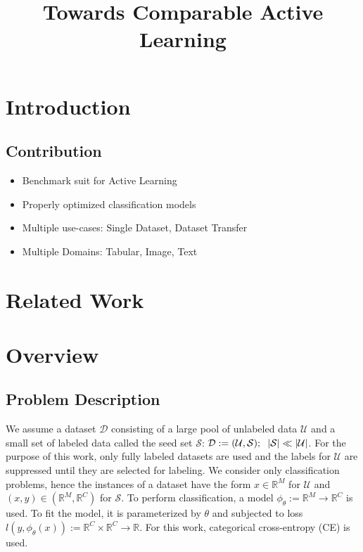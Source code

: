 \documentclass[]{article}
\title{Towards Comparable Active Learning}
\begin{document}
\maketitle

\section{Introduction}


\subsection{Contribution}
\begin{itemize}
	\item Benchmark suit for Active Learning
	\item Properly optimized classification models
	\item Multiple use-cases: Single Dataset, Dataset Transfer
	\item Multiple Domains: Tabular, Image, Text
\end{itemize}

\section{Related Work}

\section{Overview}

\subsection{Problem Description}
We assume a dataset $\mathcal{D}$ consisting of a large pool of unlabeled data $\mathcal{U}$ and a small set of labeled data called the seed set $\mathcal{S}$: $\mathcal{D} := (\mathcal{U}, \mathcal{S}); \hspace{2mm} |\mathcal{S}| \ll |\mathcal{U|}$. 
For the purpose of this work, only fully labeled datasets are used and the labels for $\mathcal{U}$ are suppressed until they are selected for labeling.
We consider only classification problems, hence the instances of a dataset have the form $x \in \mathbb{R}^M$ for $\mathcal{U}$ and $(x, y) \in (\mathbb{R}^M, \mathbb{R}^C)$ for $\mathcal{S}$.
To perform classification, a model $\phi_\theta := \mathbb{R}^M \rightarrow \mathbb{R}^C$ is used. To fit the model, it is parameterized by $\theta$ and subjected to loss $l(y, \phi_\theta(x)) := \mathbb{R}^C \times \mathbb{R}^C \rightarrow \mathbb{R}$. For this work, categorical cross-entropy (CE) is used.
\end{document}
